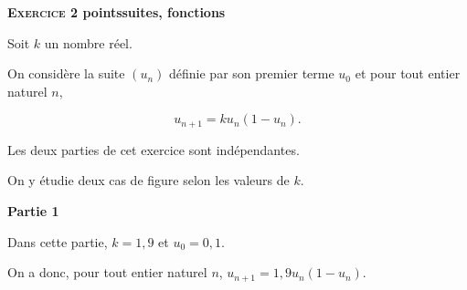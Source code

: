\documentclass[11pt]{article}
\begin{document}
\bigskip

\textbf{\textsc{Exercice 2}  points\hfill suites, fonctions}

\medskip

Soit $k$ un nombre réel.

On considère la suite $\left(u_n\right)$ définie par son premier terme $u_0$ et pour tout entier naturel $n$,

\[u_{n+1} = ku_n\left(1- u_n\right).\]

Les deux parties de cet exercice sont indépendantes. 

On y étudie deux cas de figure selon les valeurs de $k$.

\bigskip

\textbf{Partie 1}

\medskip

Dans cette partie, $k = 1,9$ et $u_0 = 0,1$.

On a donc,  pour tout entier naturel $n$,\: $u_{n+1} = 1,9u_n\left(1 - u_n\right)$.

\medskip
\end{document}
